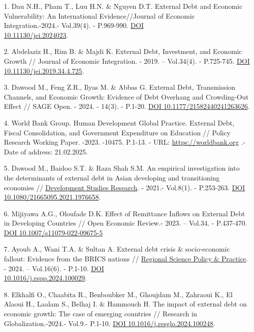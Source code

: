\begin{references}
1. Dau N.H., Pham T., Luu H.N. \& Nguyen D.T. External Debt and Economic
Vulnerability: An Internat\-ional Evidence//Journal of Economic
Integration.-2024.- Vol.39(4). - P.969-990.
\href{https://doi.org/10.11130/jei.2024023}{DOI \\10.11130/jei.2024023}.

2. Abdelaziz H., Rim B. \& Majdi K. External Debt, Investment, and
Economic Growth // Journal of Economic Integration. - 2019. --
Vol.34(4). - P.725-745.
\href{https://doi.org/10.11130/jei.2019.34.4.725}{DOI
10.11130/jei.2019.34.4.725}.

3. Dawood M., Feng Z.R., Ilyas M. \& Abbas G. External Debt,
Transmission Channels, and Economic Growth: Evidence of Debt Overhang
and Crowding-Out Effect // SAGE Open. - 2024. - 14(3). - P.1-20.
\href{https://doi.org/10.1177/21582440241263626}{DOI
10.1177/21582440241263626}.

4. World Bank Group. Human Development Global Practice. External Debt,
Fiscal Consolidation, and Government Expenditure on Education // Policy
Research Working Paper. -2023. -10475. P.1-13. - URL:
\href{https://documents1.https://worldbank.org/curated/en/099748506072325934/pdf/IDU09d7e7fa50fbff046e00a8a80e07ac5341e5b.pdf}{https://worldbank.org} .-
Date of address: 21.02.2025.

5. Dawood M., Baidoo S.T. \& Raza Shah S.M. An empirical investigation
into the determinants of external debt in Asian developing and
transitioning economies //
\href{https://www.tandfonline.com/journals/rdsr20}{Development Studies
Research}. - 2021.- Vol.8(1). - P.253-263.
\href{https://doi.org/10.1080/21665095.2021.1976658}{DOI
10.1080/21665095.2021.1976658}.

6. Mijiyawa A.G., Oloufade D.K. Effect of Remittance Inflows on External
Debt in Developing Countries // Open Economic Review.- 2023. -- Vol.34.
- P.437-470. \href{https://doi.org/10.1007/s11079-022-09675-5}{DOI
10.1007/s11079-022-09675-5}

7. Ayoub A., Wani T.A. \& Sultan A. External debt crisis \&
socio-economic fallout: Evidence from the BRICS nations //
\href{https://www.sciencedirect.com/journal/regional-science-policy-and-practice}{Regional
Science Policy \& Practice}. - 2024. -- Vol.16(6). - P.1-10.
\href{https://doi.org/10.1016/j.rspp.2024.100029}{DOI\\
10.1016/j.rspp.2024.100029}.

8. Elkhalfi O., Chaabita R., Benboubker M., Ghoujdam M., Zahraoui K., El
Alaoui H., Laalam S., Belhaj I. \& Hammouch H. The impact of external
debt on economic growth: The case of emerging countries // Research in
Globalization.-2024.- Vol.9.- P.1-10.
\href{https://doi.org/10.1016/j.resglo.2024.100248}{DOI
10.1016/j.resglo.2024.100248}.


\end{references}
